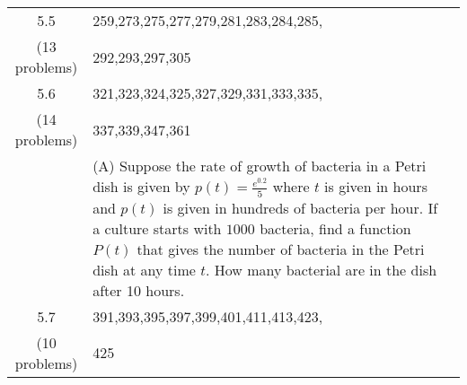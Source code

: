 \documentclass[11pt,fleqn]{article}
\begin{document}
\begin{tabularx}{\textwidth}{|c|| X | X | }
5.5&259,273,275,277,279,281,283,284,285,& \\ 
(13 problems)&292,293,297,305& \\ \hline

5.6&321,323,324,325,327,329,331,333,335,& \\ 
(14 problems)&337,339,347,361&\\
&(A) Suppose the rate of growth of bacteria in a Petri dish is given by $p(t)=\frac{e^{0.2}}{5}$ where $t$ is given in hours and $p(t)$ is given in hundreds of bacteria per hour. If a culture starts with $1000$ bacteria, find a function $P(t)$ that gives the number of bacteria in the Petri dish at any time $t.$ How many bacterial are in the dish after 10  hours. & \\ \hline

5.7&391,393,395,397,399,401,411,413,423,& \\ 
(10 problems) &425& \\ \hline


\end{tabularx}
\vfill
\end{document}
